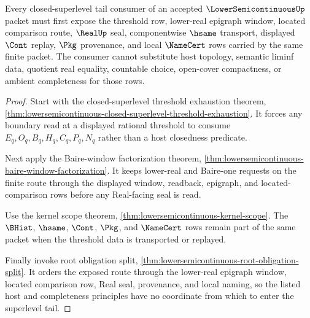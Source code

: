 \begin{theorem}
\label{thm:lowersemicontinuous-superlevel-tail-obligation}
Every closed-superlevel tail consumer of an accepted $\LowerSemicontinuousUp$ packet must first expose the threshold row, lower-real epigraph window, located comparison route, $\RealUp$ seal, componentwise $\hsame$ transport, displayed $\Cont$ replay, $\Pkg$ provenance, and local $\NameCert$ rows carried by the same finite packet. The consumer cannot substitute host topology, semantic liminf data, quotient real equality, countable choice, open-cover compactness, or ambient completeness for those rows.
\end{theorem}
\begin{proof}
Start with the closed-superlevel threshold exhaustion theorem, \autoref{thm:lowersemicontinuous-closed-superlevel-threshold-exhaustion}. It forces any boundary read at a displayed rational threshold to consume $E_q,O_q,B_q,H_q,C_q,P_q,N_q$ rather than a host closedness predicate.

Next apply the Baire-window factorization theorem, \autoref{thm:lowersemicontinuous-baire-window-factorization}. It keeps lower-real and Baire-one requests on the finite route through the displayed window, readback, epigraph, and located-comparison rows before any Real-facing seal is read.

Use the kernel scope theorem, \autoref{thm:lowersemicontinuous-kernel-scope}. The $\BHist$, $\hsame$, $\Cont$, $\Pkg$, and $\NameCert$ rows remain part of the same packet when the threshold data is transported or replayed.

Finally invoke root obligation split, \autoref{thm:lowersemicontinuous-root-obligation-split}. It orders the exposed route through the lower-real epigraph window, located comparison row, Real seal, provenance, and local naming, so the listed host and completeness principles have no coordinate from which to enter the superlevel tail.
\end{proof}
